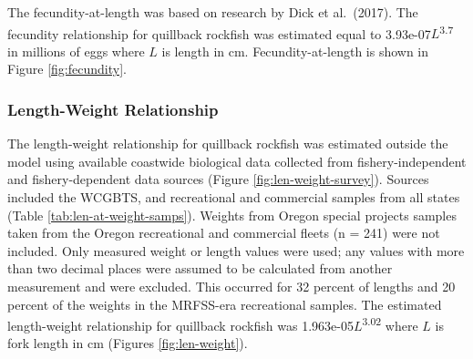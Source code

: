 \documentclass[11pt,
  english,
  a4paper,
]{article}
\begin{document}
\leavevmode\tagmcend\tagstructend\par


The fecundity-at-length was based on research by Dick et al.~{(2017)\leavevmode\tagmcend\tagstructend}. The fecundity relationship for quillback rockfish was estimated equal to 3.93e-07{\(L\)\leavevmode\tagmcend\tagstructend}\textsuperscript{3.7} in millions of eggs where {\(L\)\leavevmode\tagmcend\tagstructend} is length in cm. Fecundity-at-length is shown in Figure \ref{fig:fecundity}.

\leavevmode\tagmcend\tagstructend\par


\hypertarget{length-weight-relationship}{%
\subsubsection{Length-Weight Relationship}\label{length-weight-relationship}}

\leavevmode\tagmcend\tagstructend


The length-weight relationship for quillback rockfish was estimated outside the model using available coastwide biological data collected from fishery-independent and fishery-dependent data sources (Figure \ref{fig:len-weight-survey}). Sources included the WCGBTS, and recreational and commercial samples from all states (Table \ref{tab:len-at-weight-samps}). Weights from Oregon special projects samples taken from the Oregon recreational and commercial fleets (n = 241) were not included. Only measured weight or length values were used; any values with more than two decimal places were assumed to be calculated from another measurement and were excluded. This occurred for 32 percent of lengths and 20 percent of the weights in the MRFSS-era recreational samples. The estimated length-weight relationship for quillback rockfish was 1.963e-05{\(L\)\leavevmode\tagmcend\tagstructend}\textsuperscript{3.02} where {\(L\)\leavevmode\tagmcend\tagstructend} is fork length in cm (Figures \ref{fig:len-weight}).
\end{document}
